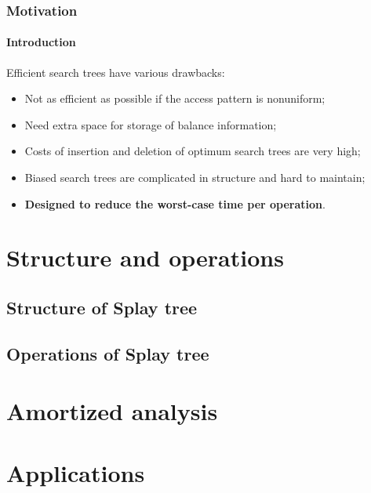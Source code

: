 \documentclass{beamer}
\begin{document}
    \begin{frame}
        \frametitle{Motivation}
        \framesubtitle{Introduction}
    
        Efficient search trees have various drawbacks\cite{10.1145/3828.3835}:
        \begin{itemize}
            \item Not as efficient as possible if the access pattern is nonuniform;
            \item Need extra space for storage of balance information;
            \item Costs of insertion and deletion of optimum search trees are very high;
            \item Biased search trees are complicated in structure and hard to maintain; \pause
            \item \textbf{Designed to reduce the worst-case time per operation}.
        \end{itemize}
    
    \end{frame}

    \section{Structure and operations}
    \subsection{Structure of Splay tree}
    \subsection{Operations of Splay tree}

    \section{Amortized analysis}

    \section{Applications}

    
\end{document}

